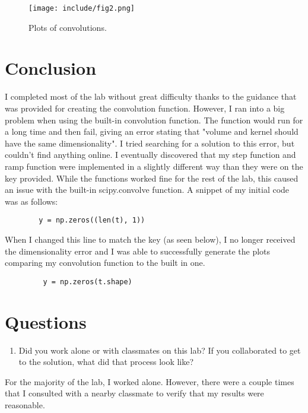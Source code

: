 \documentclass[12pt]{article}
\begin{document}
    \begin{figure}
        \centering
        \texttt{[image: include/fig2.png]}
        \caption{Plots of convolutions.}
    \end{figure}
    
    
\newpage
\section{Conclusion}
    \par I completed most of the lab without great difficulty thanks to the guidance that was provided for creating the convolution function. However, I ran into a big problem when using the built-in convolution function. The function would run for a long time and then fail, giving an error stating that "volume and kernel should have the same dimensionality". I tried searching for a solution to this error, but couldn't find anything online. I eventually discovered that my step function and ramp function were implemented in a slightly different way than they were on the key provided. While the functions worked fine for the rest of the lab, this caused an issue with the built-in scipy.convolve function. A snippet of my initial code was as follows:
    \begin{verbatim}
        y = np.zeros((len(t), 1))
    \end{verbatim}
    When I changed this line to match the key (as seen below), I no longer received the dimensionality error and I was able to successfully generate the plots comparing my convolution function to the built in one.
    \begin{verbatim}
         y = np.zeros(t.shape)
    \end{verbatim}
    
\newpage
\section*{Questions}

\begin{enumerate}
    \item Did you work alone or with classmates on this lab? If you collaborated to get to the solution, what did that process look like?
\end{enumerate}
    \par For the majority of the lab, I worked alone. However, there were a couple times that I consulted with a nearby classmate to verify that my results were reasonable.
    
\end{document}
